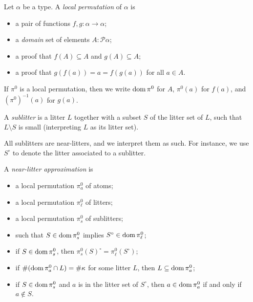 \documentclass{article}
\begin{document}
\begin{definition}
    Let \( \alpha \) be a type.
    A \emph{local permutation} of \( \alpha \) is
    \begin{itemize}
        \item a pair of functions \( f, g \colon \alpha \to \alpha \);
        \item a \emph{domain} set of elements \( A : \mathcal P \alpha \);
        \item a proof that \( f(A) \subseteq A \) and \( g(A) \subseteq A \);
        \item a proof that \( g(f(a)) = a = f(g(a)) \) for all \( a \in A \).
    \end{itemize}
    If \( \pi^0 \) is a local permutation, then we write \( \operatorname{dom} \pi^0 \) for \( A \), \( \pi^0(a) \) for \( f(a) \), and \( (\pi^0)^{-1}(a) \) for \( g(a) \).
\end{definition}
\begin{definition}
    A \emph{sublitter} is a litter \( L \) together with a subset \( S \) of the litter set of \( L \), such that \( L \setminus S \) is small (interpreting \( L \) as its litter set).
\end{definition}
\begin{remark}
    All sublitters are near-litters, and we interpret them as such.
    For instance, we use \( S^\circ \) to denote the litter associated to a sublitter.
\end{remark}
\begin{definition}
    A \emph{near-litter approximation} is
    \begin{itemize}
        \item a local permutation \( \pi^0_a \) of atoms;
        \item a local permutation \( \pi^0_\ell \) of litters;
        \item a local permutation \( \pi^0_s \) of sublitters;
        \item such that \( S \in \operatorname{dom} \pi^0_s \) implies \( S^\circ \in \operatorname{dom} \pi^0_\ell \);
        \item if \( S \in \operatorname{dom} \pi^0_s \), then \( \pi^0_s(S)^\circ = \pi^0_\ell(S^\circ) \);
        \item if \( \#(\operatorname{dom} \pi^0_a \cap L) = \#\kappa \) for some litter \( L \), then \( L \subseteq \operatorname{dom} \pi^0_a \);
        \item if \( S \in \operatorname{dom} \pi^0_s \) and \( a \) is in the litter set of \( S^\circ \), then \( a \in \operatorname{dom} \pi^0_a \) if and only if \( a \not\in S \).
    \end{itemize}
\end{definition}
\end{document}
